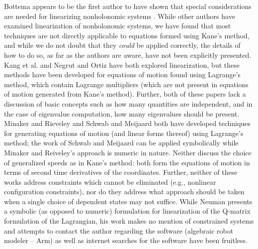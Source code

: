 \documentclass[smallcondensed,final]{svjour3}                     %
\begin{document}
Bottema appears to be the first author to have shown that special
considerations are needed for linearizing nonholonomic systems
\cite{Bottema1949}. While other authors have examined linearization of
nonholonomic systems, we have found that most techniques are not directly
applicable to equations formed using Kane's method, and while we do not doubt
that they \textit{could} be applied correctly, the details of how to do so, as
far as the authors are aware, have not been explicitly presented. Kang et al.
\cite{Kang2003} and Negrut and Ortiz \cite{Negrut2006} have both explored
linearization, but these methods have been developed for equations of motion
found using Lagrange's method, which contain Lagrange multipliers (which are
not present in equations of motion generated from Kane's method). Further, both
of these papers lack a discussion of basic concepts such as how many quantities
are independent, and in the case of eigenvalue computation, how many
eigenvalues should be present. Minaker and Rieveley \cite{Minaker2010} and
Schwab and Meijaard \cite{Schwab2003} both have developed techniques for
generating equations of motion (and linear forms thereof) using Lagrange's
method; the work of Schwab and Meijaard can be applied symbolically while
Minaker and Reiveley's approach is numeric in nature. Neither discuss the
choice of generalized speeds as in Kane's method: both form the equations of
motion in terms of second time derivatives of the coordinates.  Further,
neither of these works address constraints which cannot be eliminated (e.g.,
nonlinear configuration constraints), nor do they address what approach should
be taken when a single choice of dependent states may not suffice. While
Neuman presents a symbolic (as opposed to numeric) formulation for
linearization of the Q-matrix formulation of the Lagrangian\cite{Neuman1984},
his work makes no mention of constrained systems and attempts to contact the
author regarding the software (algebraic robot modeler -- Arm) as well as
internet searches for the software have been fruitless.

\end{document}
